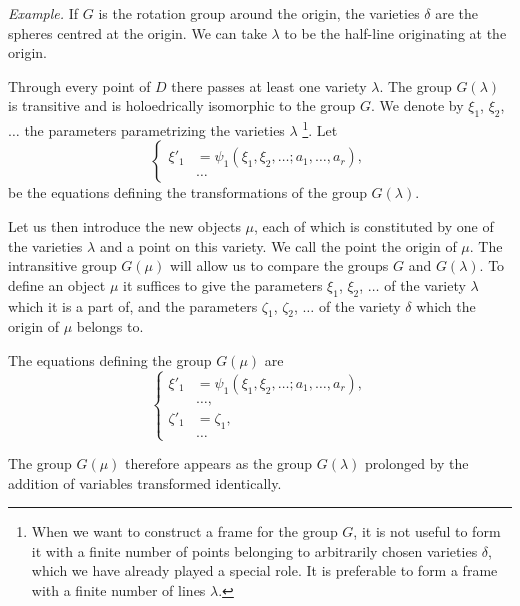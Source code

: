 \somespace

{\small
\emph{Example.} If $G$ is the rotation group around the origin, the varieties $\delta$ are the spheres centred at the origin. We can take $\lambda$ to be the half-line originating at the origin.
}

\somespace

Through every point of $D$ there passes at least one variety $\lambda$. The group $G(\lambda)$ is transitive and is holoedrically isomorphic to the group $G$. We denote by $\xi_{1}$, $\xi_{2}$, $\dots$ the parameters parametrizing the varieties $\lambda$ \footnote{When we want to construct a frame for the group $G$, it is not useful to form it with a finite number of points belonging to arbitrarily chosen varieties $\delta$, which we have already played a special role. It is preferable to form a frame with a finite number of lines $\lambda$.}. Let
\begin{equation}
  \label{eq:7.9}
  \left\{
    \begin{aligned}
      \xi'_{1}&=\psi_{1}(\xi_{1},\xi_{2},\dots;a_{1},\dots,a_{r}),\\
      &\dots
    \end{aligned}
  \right.
\end{equation}
be the equations defining the transformations of the group $G(\lambda)$.

Let us then introduce the new objects $\mu$, each of which is constituted by one of the varieties $\lambda$ and a point on this variety. We call the point the origin of $\mu$. The intransitive group $G(\mu)$ will allow us to compare the groups $G$ and $G(\lambda)$. To define an object $\mu$ it suffices to give the parameters $\xi_{1}$, $\xi_{2}$, $\dots$ of the variety $\lambda$ which it is a part of, and the parameters $\zeta_{1}$, $\zeta_{2}$, $\dots$ of the variety $\delta$ which the origin of $\mu$ belongs to.

The equations defining the group $G(\mu)$ are
\begin{equation}
  \label{eq:7.10}
  \left\{
    \begin{aligned}
      \xi'_{1}&=\psi_{1}(\xi_{1},\xi_{2},\dots;a_{1},\dots,a_{r}),\\
      &\dots,\\
      \zeta'_{1}&=\zeta_{1},\\
      &\dots
    \end{aligned}
  \right.
\end{equation}

The group $G(\mu)$ therefore appears as the group $G(\lambda)$ prolonged by the addition of variables transformed identically.

